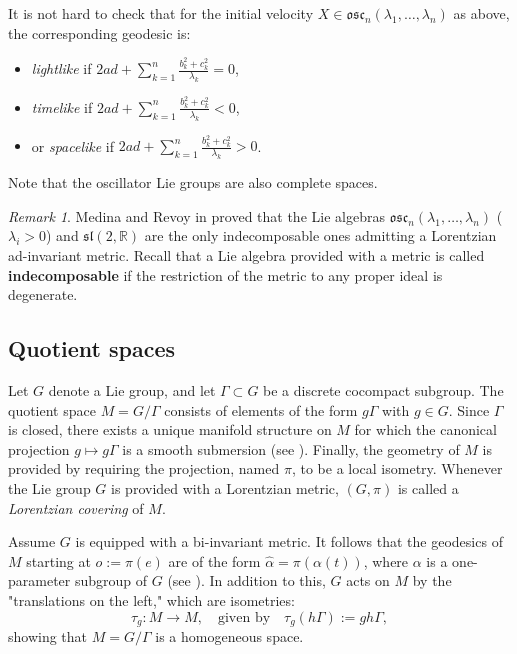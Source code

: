 \documentclass[12pt]{amsart}
\theoremstyle{plain}
\theoremstyle{definition}
\theoremstyle{remark}
\newtheorem{rem}{Remark}
\begin{document}
It is not hard to check that for the initial velocity \( X \in \mathfrak{osc}_n(\lambda_1, \ldots, \lambda_n) \) as above, the corresponding geodesic is:
\begin{itemize}
    \item \textit{lightlike} if \( 2ad + \sum_{k=1}^{n} \frac{b_k^2 + c_k^2}{\lambda_k} = 0 \),
    \item \textit{timelike} if \( 2ad + \sum_{k=1}^{n} \frac{b_k^2 + c_k^2}{\lambda_k} < 0 \),
    \item or \textit{spacelike} if \( 2ad + \sum_{k=1}^{n} \frac{b_k^2 + c_k^2}{\lambda_k} > 0 \).
\end{itemize}

Note that the oscillator Lie groups are also complete spaces.
\smallskip

\begin{rem}
    Medina and Revoy in \cite{Me,MeRe} proved that the Lie algebras \( \mathfrak{osc}_n(\lambda_1, \ldots, \lambda_n) \) (\( \lambda_i > 0 \)) and \( \mathfrak{sl}(2, \mathbb{R}) \) are the only indecomposable ones admitting a Lorentzian ad-invariant metric. Recall that a Lie algebra provided with a metric is called \textbf{indecomposable} if the restriction of the metric to any proper ideal is degenerate.
\end{rem}

\subsection{Quotient spaces}

Let \( G \) denote a Lie group, and let \( \Gamma \subset G \) be a discrete cocompact subgroup. The quotient space \( M = G/\Gamma \) consists of elements of the form \( g\Gamma \) with \( g \in G \). Since \( \Gamma \) is closed, there exists a unique manifold structure on \( M \) for which the canonical projection \( g \mapsto g\Gamma \) is a smooth submersion (see \cite{Hel}). Finally, the geometry of \( M \) is provided by requiring the projection, named \( \pi \), to be a local isometry. Whenever the Lie group \( G \) is provided with a Lorentzian metric, \( (G, \pi) \) is called a \textit{Lorentzian covering} of \( M \).

Assume \( G \) is equipped with a bi-invariant metric. It follows that the geodesics of \( M \) starting at \( o := \pi(e) \) are of the form \( \hat{\alpha} = \pi(\alpha(t)) \), where \( \alpha \) is a one-parameter subgroup of \( G \) (see \cite{ON}). In addition to this, \( G \) acts on \( M \) by the "translations on the left," which are isometries:
\begin{equation*}
    \tau_g : M \rightarrow M, \quad \text{given by} \quad \tau_g(h\Gamma) := gh\Gamma,
\end{equation*}
showing that \( M = G/\Gamma \) is a homogeneous space.
\end{document}
